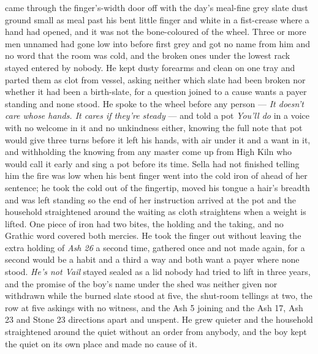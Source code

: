  came through the finger's-width door off  with the day's meal-fine grey slate dust ground small as meal past his bent little finger and white in a fist-crease where a hand had opened, and it was not the bone-coloured  of the wheel. Three or more men unnamed had gone low into  before first grey and got no name from him and no word that the room was cold, and the broken ones under the lowest rack stayed entered by nobody. He kept dusty forearms and clean on one tray and parted them as clot from vessel, asking neither which slate had been broken nor whether it had been a birth-slate, for a question joined to a cause wants a payer standing and none stood. He spoke to the wheel before any person --- \emph{It doesn't care whose hands. It cares if they're steady} --- and told a pot \emph{You'll do} in a voice with no welcome in it and no unkindness either, knowing the full note that pot would give three turns before it left his hands, with air under it and a want in it, and withholding the knowing from any master come up from High Kiln who would call it early and sing a pot before its time. Sella had not finished telling him the fire was low when his bent finger went into the cold iron of  ahead of her sentence; he took the cold out of the fingertip, moved his tongue a hair's breadth and was left standing so the end of her instruction arrived at the pot and the household straightened around the waiting as cloth straightens when a weight is lifted. One piece of iron had two bites, the holding and the taking, and no Grathic word covered both mercies. He took the finger out without leaving the extra holding of \emph{Ash 26} a second time, gathered once and not made again, for a second would be a habit and a third a way and both want a payer where none stood. \emph{He's not Vail} stayed sealed as a lid nobody had tried to lift in three years, and the promise of the boy's name under the shed was neither given nor withdrawn while the burned slate stood at five, the shut-room tellings at two, the row at five askings with no witness, and the Ash 5 joining and the Ash 17, Ash 23 and Stone 23 directions apart and unspent. He grew quieter and the household straightened around the quiet without an order from anybody, and the boy kept the quiet on its own place and made no cause of it.

